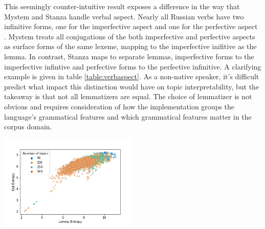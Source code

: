 \documentclass[11pt,a4paper]{article}
\begin{document}
This seemingly counter-intuitive result exposes a difference in the way that Mystem and Stanza handle verbal aspect. Nearly all Russian verbs have two infinitive forms, one for the imperfective aspect and one for the perfective aspect \cite{wade2020comprehensive}. Mystem treats all conjugations of the both imperfective and perfective aspects as surface forms of the same lexeme, mapping to the imperfective inifitive as the lemma. In contrast, Stanza maps to separate lemmas, imperfective forms to the imperfective infintive and perfective forms to the perfective infinitive. A clarifying example is given in table \ref{table:verbaspect}. As a non-native speaker, it's difficult predict what impact this distinction would have on topic interpretability, but the takeaway is that not all lemmatizers are equal. The choice of lemmatizer is not obvious and requires consideration of how the implementation groups the language's grammatical features and which grammatical features matter in the corpus domain.



\begin{center}
    \includegraphics[width=0.5\textwidth]{lemma_slot_entropy_scatter.png}
    \label{fig:lemma_vs_slot_entropy}
\end{center}
\end{document}
